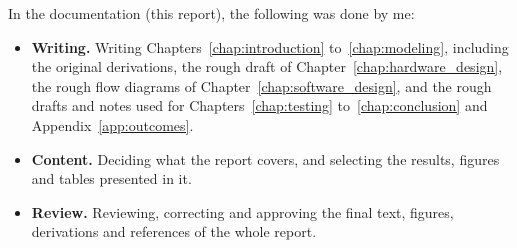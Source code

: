 In the documentation (this report), the following was done by me:
\begin{itemize}[label=\textbullet]
  \item \textbf{Writing.} Writing Chapters~\ref{chap:introduction}
    to~\ref{chap:modeling}, including the original derivations, the rough
    draft of Chapter~\ref{chap:hardware_design}, the rough flow diagrams
    of Chapter~\ref{chap:software_design}, and the rough drafts and notes
    used for Chapters~\ref{chap:testing} to~\ref{chap:conclusion} and
    Appendix~\ref{app:outcomes}.
  \item \textbf{Content.} Deciding what the report covers, and selecting
    the results, figures and tables presented in it.
  \item \textbf{Review.} Reviewing, correcting and approving the final
    text, figures, derivations and references of the whole report.
\end{itemize}
